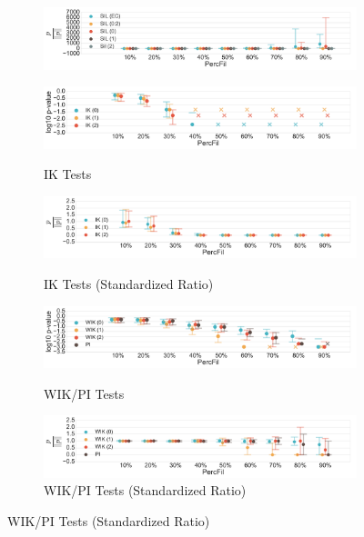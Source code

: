 \documentclass[12pt]{article}
\begin{document}
\begin{center}
\begin{figure}[htp!]
\begin{subfigure}{.48\textwidth}
        \includegraphics[width=\linewidth, height = .75in]{figure_8_joint_all_silhouette_group.pdf}
        \label{fig:all_silh_normed_normed}
      \end{subfigure}
      \begin{subfigure}{.48\textwidth}
        \centering
        \caption{IK Tests}
        \includegraphics[width=\linewidth, height = .75in]{figure_8_all_contour_group.pdf}
        \label{fig:all_contour}
      \end{subfigure}
      \begin{subfigure}{.48\textwidth}
        \centering
        \caption{IK Tests (Standardized Ratio)}
        \includegraphics[width=\linewidth, height = .75in]{figure_8_joint_all_contour_group.pdf}
        \label{fig:all_contour_normed}
      \end{subfigure}
      \begin{subfigure}{.48\textwidth}
        \centering
        \caption{WIK/PI Tests}
        \includegraphics[width=\linewidth, height = .75in]{figure_8_all_weighted_contour_group.pdf}
        \label{fig:all_weight}
      \end{subfigure}
      \begin{subfigure}{.48\textwidth}
        \centering
        \caption{WIK/PI Tests (Standardized Ratio)}
        \includegraphics[width=\linewidth, height = .75in]{figure_8_joint_all_weighted_contour_group.pdf}

\end{subfigure}
\end{figure}
\end{center}
\end{document}
